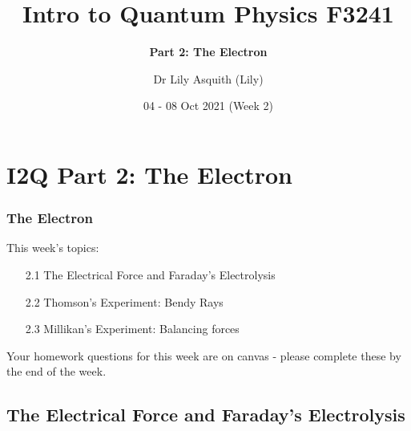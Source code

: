 


% 
\title[ Intro to Quantum Physics]{Intro to Quantum Physics F3241}
\subtitle{\textbf{Part 2: The Electron}}
\author[Dr Lily Asquith (Lily)]{ Dr Lily Asquith (Lily)}
\date[04 - 08 Oct 2021]{ 04 - 08 Oct 2021 (Week 2)}





\begin{frame}
\titlepage
\end{frame} 

\section{I2Q Part 2: The Electron}
\begin{frame}
\frametitle{The Electron} 
\normalsize

This week's topics:\\[3ex]

\begin{itemize}
\item[2.1] The Electrical Force and Faraday's Electrolysis\\[3ex]
\item[2.2] Thomson's Experiment: Bendy Rays\\[3ex]
\item[2.3] Millikan's Experiment: Balancing forces\\[3ex]
\end{itemize}

Your homework questions for this week are on canvas - please complete these by the end of the week.
\end{frame} 
 
 
 \subsection{The Electrical Force and Faraday's Electrolysis}

